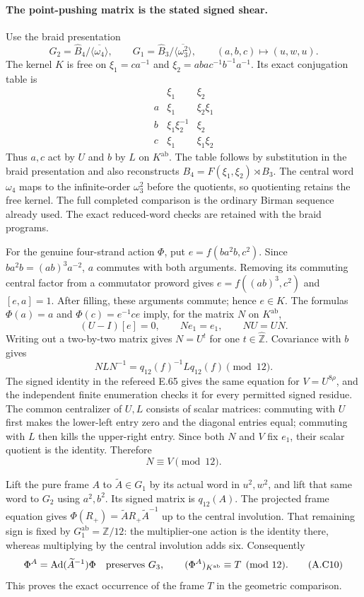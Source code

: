 \paragraph{The point-pushing matrix is the stated signed shear.}
Use the braid presentation
\[
 G_2=\widehat B_4/\overline{\langle\omega_4\rangle},\qquad
 G_1=\widehat B_3/\overline{\langle\omega_3^2\rangle},\qquad
 (a,b,c)\longmapsto(u,w,u).
\]
The kernel $K$ is free on
$\xi_1=ca^{-1}$ and $\xi_2=aba c^{-1}b^{-1}a^{-1}$. Its exact
conjugation table is
\[
\begin{array}{c|cc}
 &\xi_1&\xi_2\\ \hline
 a&\xi_1&\xi_2\xi_1\\
 b&\xi_1\xi_2^{-1}&\xi_2\\
 c&\xi_1&\xi_1\xi_2
\end{array}
\tag{A.C8}
\]
Thus $a,c$ act by $U$ and $b$ by $L$ on $K^{\mathrm{ab}}$.
The table follows by substitution in the braid presentation and
also reconstructs $B_4=F(\xi_1,\xi_2)\rtimes B_3$. The central
word $\omega_4$ maps to the infinite-order $\omega_3^2$ before the
quotients, so quotienting retains the free kernel. The full
completed comparison is the ordinary Birman sequence already used.
The exact reduced-word checks are retained with the braid programs.

For the genuine four-strand action $\Phi$, put
$e=f(ba^2b,c^2)$. Since $ba^2b=(ab)^3a^{-2}$, $a$ commutes with
both arguments. Removing its commuting central factor from a
commutator proword gives $e=f((ab)^3,c^2)$ and $[e,a]=1$.
After filling, these arguments commute; hence $e\in K$.
The formulas $\Phi(a)=a$ and $\Phi(c)=e^{-1}ce$ imply, for the
matrix $N$ on $K^{\mathrm{ab}}$,
\[
 (U-I)[e]=0,\qquad Ne_1=e_1,\qquad NU=UN.
\]
Writing out a two-by-two matrix gives $N=U^t$ for one
$t\in\widehat{\mathbb Z}$. Covariance with $b$ gives
\[
 NLN^{-1}=q_{12}(f)^{-1}Lq_{12}(f)\pmod {12}.
\]
The signed identity in the refereed E.65 gives the same equation
for $V=U^{8\rho}$, and the independent finite enumeration checks
it for every permitted signed residue. The common centralizer of
$U,L$ consists of scalar matrices: commuting with $U$ first makes
the lower-left entry zero and the diagonal entries equal; commuting
with $L$ then kills the upper-right entry. Since both $N$ and $V$
fix $e_1$, their scalar quotient is the identity. Therefore
\[
                           N\equiv V\pmod {12}.
 \tag{A.C9}
\]

Lift the pure frame $A$ to $\widetilde A\in G_1$ by its actual
word in $u^2,w^2$, and lift that same word to $G_2$ using $a^2,b^2$.
Its signed matrix is $q_{12}(A)$. The projected frame equation gives
$\Phi(R_+)=\widetilde A R_+\widetilde A^{-1}$ up to the central
involution. That remaining sign is fixed by
$G_1^{\mathrm{ab}}=\mathbb Z/12$: the multiplier-one action is
the identity there, whereas multiplying by the central involution
adds six. Consequently
\[
 \Phi^A=\operatorname{Ad}(\widetilde A^{-1})\Phi
 \quad\hbox{preserves }G_3,\qquad
 (\Phi^A)_{K^{\mathrm{ab}}}\equiv T\pmod {12}.
 \tag{A.C10}
\]
This proves the exact occurrence of the frame $T$ in the geometric
comparison.

